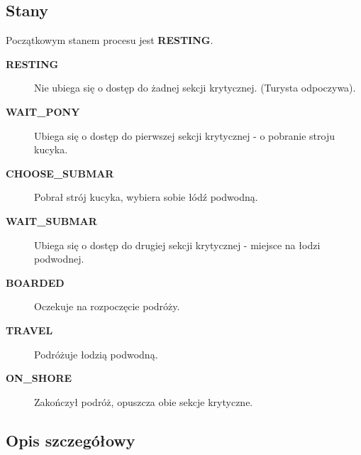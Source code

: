 \documentclass[a4paper]{article}
\begin{document}
\subsection{Stany}
Początkowym stanem procesu jest \textbf{RESTING}.
\begin{description}
    \item [\textbf{RESTING}] Nie ubiega się o dostęp do żadnej sekcji krytycznej. (Turysta odpoczywa).
    \item [\textbf{WAIT\_PONY}] Ubiega się o dostęp do pierwszej sekcji krytycznej - o pobranie stroju kucyka.
    \item [\textbf{CHOOSE\_SUBMAR}] Pobrał strój kucyka, wybiera sobie łódź podwodną.
    \item [\textbf{WAIT\_SUBMAR}] Ubiega się o dostęp do drugiej sekcji krytycznej - miejsce na łodzi podwodnej.
    \item [\textbf{BOARDED}] Oczekuje na rozpoczęcie podróży.
    \item [\textbf{TRAVEL}] Podróżuje łodzią podwodną.
    \item [\textbf{ON\_SHORE}] Zakończył podróż, opuszcza obie sekcje krytyczne.
\end{description}

\resetlinenumber[1]\linenumbers
\subsection{Opis szczegółowy}
\end{document}
